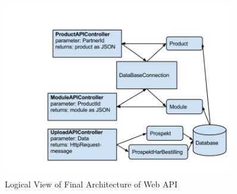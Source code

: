\begin{center}
\begin{figure}[H]
\centering
\includegraphics[width=0.9\textwidth]{images/architecture_finalwebapi01.png}
\caption{Logical View of Final Architecture of Web API}
\label{fig:process_view_webapi}
\end{figure}
\end{center}


